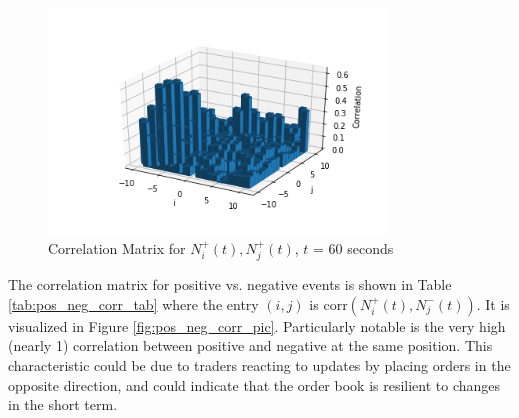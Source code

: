\begin{figure}[t]
\begin{center}
\caption{Correlation Matrix for $N^{+}_i(t), N^{+}_j(t)$, $t$ = 60 seconds}
\label{fig:pos_pos_corr_pic}
\includegraphics[width=0.8\textwidth]{LaTeX/Figures/pos_pos_correlations.png}
\end{center}
\end{figure}

The correlation matrix for positive vs. negative events is shown in Table \ref{tab:pos_neg_corr_tab} where the entry $(i,j)$ is $\text{corr}(N^{+}_i(t), N^{-}_j(t))$. It is visualized in Figure \ref{fig:pos_neg_corr_pic}. Particularly notable is the very high (nearly 1) correlation between positive and negative at the same position. This characteristic could be due to traders reacting to updates by placing orders in the opposite direction, and could indicate that the order book is resilient to changes in the short term.

